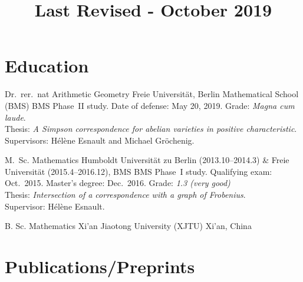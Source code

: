 \documentclass[10pt,a4paper]{moderncv}
\title{\normalsize Last Revised - October 2019}
\begin{document}
\maketitle





\section{Education}
%
{Dr.\ rer.\ nat}%
{Arithmetic Geometry}%
{Freie Universität, Berlin Mathematical School (BMS)}%
{}%
{
    BMS Phase~II study. Date of defense: May 20, 2019. Grade: \emph{Magna cum
    laude}.\\
    Thesis: \emph{A Simpson correspondence for abelian varieties in positive
    characteristic}.\\
    Supervisors: Hélène Esnault and Michael Gröchenig.
}

{M.\ Sc.}%
{Mathematics}%
{%
    Humboldt Universität zu Berlin (2013.10--2014.3) \&
    Freie Universität (2015.4--2016.12), BMS
}%
{}%
{%
    BMS Phase~I study. Qualifying exam: Oct.\ 2015.
    Master's degree: Dec.\ 2016. Grade: \emph{1.3 (very good)}\\
    Thesis: \emph{Intersection of a correspondence with a graph of Frobenius}.\\
    Supervisor: Hélène Esnault.
}

%
{B. Sc.}%
{Mathematics}%
{Xi'an Jiaotong University (XJTU)}%
{Xi'an, China}{}%

\section{Publications/Preprints}
\end{document}
